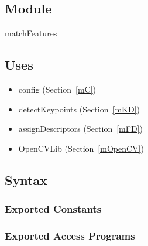 \documentclass[12pt, titlepage]{article}
\begin{document}
\subsection{Module}

matchFeatures

\subsection{Uses}
\begin{itemize}
  \item config (Section~\ref{mC})
  \item detectKeypoints (Section~\ref{mKD})
  \item assignDescriptors (Section~\ref{mFD})
  \item OpenCVLib (Section~\ref{mOpenCV})
\end{itemize}

\subsection{Syntax}

\subsubsection{Exported Constants}

\subsubsection{Exported Access Programs}
\end{document}
